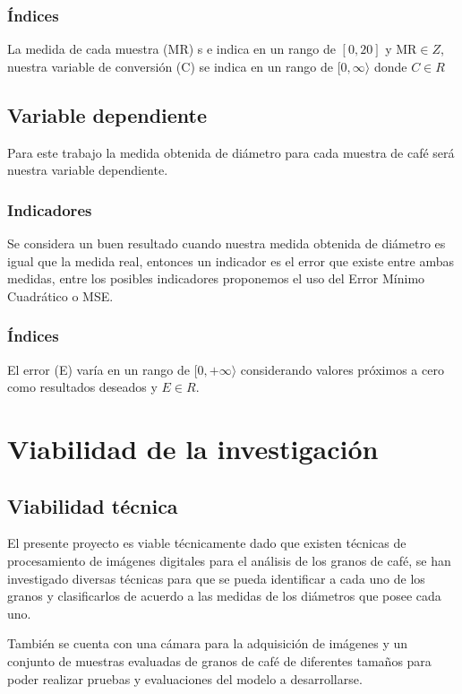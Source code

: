\documentclass[12pt,a4paper,oneside]{book}
\begin{document}
\subsubsection{Índices}
La medida de cada muestra (MR) s	e indica en un rango de $[0,20]$ y $\text{MR} \in Z$, nuestra variable de conversión (C) se indica en un rango de $[0, \infty \rangle$ donde $C \in R$

\subsection{Variable dependiente}
Para este trabajo la medida obtenida de diámetro para cada muestra de café será nuestra variable dependiente.

\subsubsection{Indicadores}
Se considera un buen resultado cuando nuestra medida obtenida de diámetro es igual que la medida real, entonces un indicador es el error que existe entre ambas medidas, entre los posibles indicadores proponemos el uso del Error Mínimo Cuadrático o MSE.

\subsubsection{Índices}
El error (E) varía en un rango de $[0,+\infty\rangle$ considerando valores próximos a cero como resultados deseados y $E \in R$.

\section{Viabilidad de la investigación}

\subsection{Viabilidad técnica}
El presente proyecto es viable técnicamente dado que existen técnicas de procesamiento de imágenes digitales para el análisis de los granos de café, se han investigado diversas técnicas para que se pueda identificar a cada uno de los granos y clasificarlos de acuerdo a las medidas de los diámetros que posee cada uno.

También se cuenta con una cámara para la adquisición de imágenes y un conjunto de muestras evaluadas de granos de café de diferentes tamaños para poder realizar pruebas y evaluaciones del modelo a desarrollarse.
\end{document}

